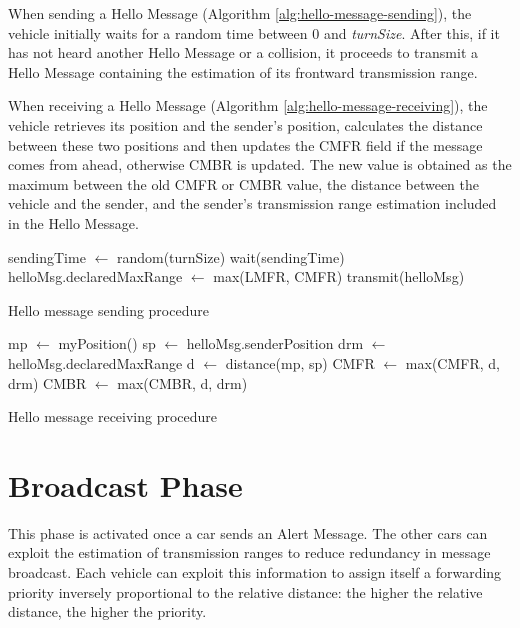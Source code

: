 		When sending a Hello Message (Algorithm \ref{alg:hello-message-sending}), the vehicle initially waits for a random time between 0 and \textit{turnSize}. After this, if it has not heard another Hello Message or a collision, it proceeds to transmit a Hello Message containing the estimation of its frontward transmission range.
		
		
		When receiving a Hello Message (Algorithm \ref{alg:hello-message-receiving}), the vehicle retrieves its position and the sender's position, calculates the distance between these two positions and then updates the CMFR field if the message comes from ahead, otherwise CMBR is updated. The new value is obtained as the maximum between the old CMFR or CMBR value, the distance between the vehicle and the sender, and the sender's transmission range estimation included in the Hello Message.
		
		\begin{algorithm}[H]
			\begin{algorithmic}[1]
					\State sendingTime $\gets$ random(turnSize)
					\State wait(sendingTime)
						\State helloMsg.declaredMaxRange $\gets$ max(LMFR, CMFR)
						\State transmit(helloMsg)
					\EndIf
				\EndFor
			\end{algorithmic}
			\caption{Hello message sending procedure}
			\label{alg:hello-message-sending}
		\end{algorithm}
		
		\begin{algorithm}[H]
			\begin{algorithmic}[1]
				\State mp $\gets$ myPosition()
				\State sp $\gets$ helloMsg.senderPosition
				\State drm $\gets$ helloMsg.declaredMaxRange
				\State d $\gets$ distance(mp, sp)
				\State CMFR $\gets$ max(CMFR, d, drm)
				\Else
				\State CMBR $\gets$ max(CMBR, d, drm)
				\EndIf
			\end{algorithmic}
			\caption{Hello message receiving procedure}
			\label{alg:hello-message-receiving}
		\end{algorithm}
	
	\section{Broadcast Phase}
		This phase is activated once a car sends an Alert Message. The other cars can exploit the estimation of transmission ranges to reduce redundancy in message broadcast. Each vehicle can exploit this information to assign itself a forwarding priority inversely proportional to the relative distance: the higher the relative distance, the higher the priority.  
		
